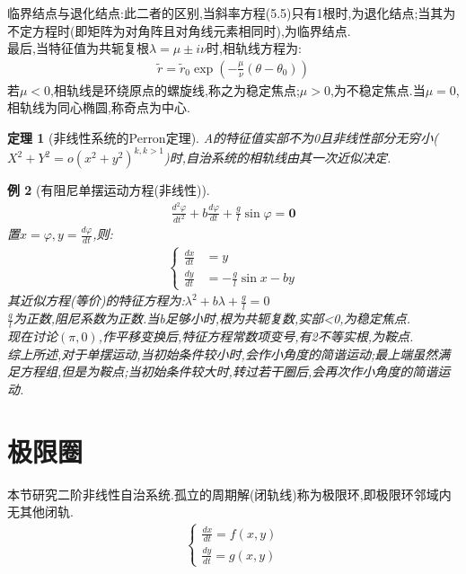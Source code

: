 \documentclass[12pt, a4paper, oneside]{ctexbook}
\newtheorem{theorem}{定理}[section]
\newtheorem{example}[theorem]{例}
\begin{document}
    临界结点与退化结点:此二者的区别,当斜率方程(5.5)只有1根时,为退化结点;当其为不定方程时(即矩阵为对角阵且对角线元素相同时),为临界结点.\\
    最后,当特征值为共轭复根$ \lambda=\mu \pm i\nu $时,相轨线方程为:
    \begin{align}
        \tilde{r}=\tilde{r}_{0}\exp\left(-\frac{\mu}{\nu}\left(\theta-\theta_{0}\right)\right)
    \end{align}
    若$\mu<0$,相轨线是环绕原点的螺旋线,称之为稳定焦点;$\mu>0$,为不稳定焦点.当$\mu=0$,相轨线为同心椭圆,称奇点为中心.\\
    \begin{theorem}[非线性系统的Perron定理]
        A的特征值实部不为0且非线性部分无穷小($ X^2+Y^2 =o{(x^2+y^2)^{k,k>1}}$)时,自治系统的相轨线由其一次近似决定.
    \end{theorem}
    \begin{example}[有阻尼单摆运动方程(非线性)]
        \begin{align}
            \frac{d^2\varphi}{dt^2}+b\frac{d\varphi}{dt}+\frac gl\sin\varphi=\mathbf{0}
        \end{align}
        置$x=\varphi,y=\frac{d\varphi}{dt}$,则:
        \begin{align}
            \begin{cases}
                \frac{dx}{dt}&=y\\ \frac{dy}{dt}&=-\frac gl \sin x-by
            \end{cases}
        \end{align}
        其近似方程(等价)的特征方程为:$\lambda^2+b\lambda+\frac gl=0$\\
        $\frac gl$为正数,阻尼系数为正数.当b足够小时,根为共轭复数,实部<0,为稳定焦点.\\
        现在讨论$(\pi,0)$,作平移变换后,特征方程常数项变号,有2不等实根,为鞍点.\\
        综上所述,对于单摆运动,当初始条件较小时,会作小角度的简谐运动;最上端虽然满足方程组,但是为鞍点;当初始条件较大时,转过若干圈后,会再次作小角度的简谐运动.\\


    \end{example}
    \section{极限圈}
    本节研究二阶非线性自治系统.孤立的周期解(闭轨线)称为极限环,即极限环邻域内无其他闭轨.
        \begin{align}
            \begin{cases}
                \frac{dx}{dt}=f(x,y)\\\frac{dy}{dt}=g(x,y)
            \end{cases}
        \end{align}
\end{document}
